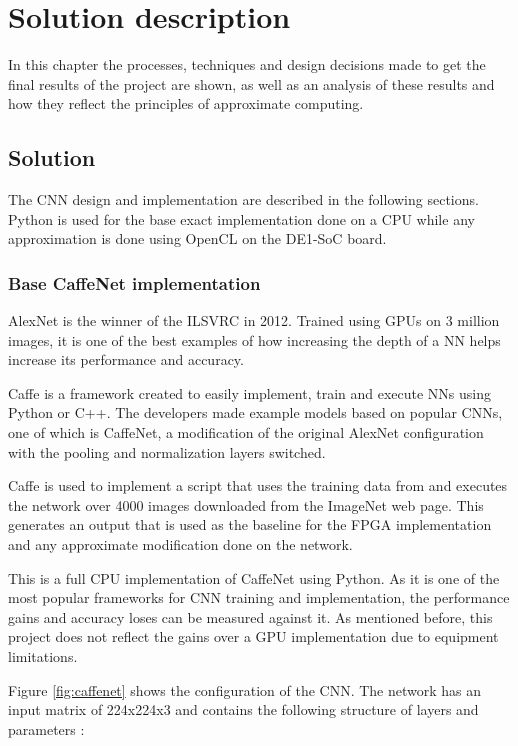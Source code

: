 \chapter{Solution description}

In this chapter the processes, techniques and design decisions made
to get the final results of the project are shown, as well as an analysis
of these results and how they reflect the principles of approximate computing.

\section{Solution}

The CNN design and implementation are described in the following sections.
Python is used for the base exact implementation done on a CPU while any approximation is done
using OpenCL on the DE1-SoC board.

\subsection{Base CaffeNet implementation}

AlexNet is the winner of the ILSVRC in 2012. Trained using GPUs on 3 million images, it is one
of the best examples of how increasing the depth of a NN helps increase its performance and accuracy.

Caffe is a framework created to easily implement, train and execute NNs using Python or C++.
The developers made example models based on popular CNNs, one of which is CaffeNet, a modification of the original
AlexNet configuration with the pooling and normalization layers switched.

Caffe is used to implement a script that uses the training data from \cite{donahue2012bvlc} and executes the network
over 4000 images downloaded from the ImageNet web page. This generates an output that is used as the baseline
for the FPGA implementation and any approximate modification done on the network.

This is a full CPU implementation of CaffeNet using Python. As it is one of the most popular frameworks for CNN
training and implementation, the performance gains and accuracy loses can be measured against it. As mentioned
before, this project
does not reflect the gains over a GPU implementation due to equipment limitations.

Figure \ref{fig:caffenet} shows the configuration of the CNN. The network has an input matrix of 224{x}224{x}3
and 
contains the following structure of layers and parameters \cite{reviewalex}:

